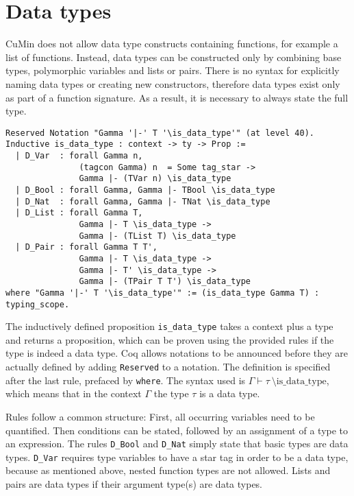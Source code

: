 \documentclass[fleqn]{scrreprt}
\newcommand{\coqinline}[1]{\texttt{#1}}
\begin{document}
\section{Data types}
CuMin does not allow data type constructs containing functions, for example a list of functions. Instead, data types can be constructed only by combining base types, polymorphic variables and lists or pairs. There is no syntax for explicitly naming data types or creating new constructors, therefore data types exist only as part of a function signature. As a result, it is necessary to always state the full type.
\begin{verbatim}
Reserved Notation "Gamma '|-' T '\is_data_type'" (at level 40).
Inductive is_data_type : context -> ty -> Prop :=
  | D_Var  : forall Gamma n,
               (tagcon Gamma) n  = Some tag_star ->
               Gamma |- (TVar n) \is_data_type
  | D_Bool : forall Gamma, Gamma |- TBool \is_data_type
  | D_Nat  : forall Gamma, Gamma |- TNat \is_data_type
  | D_List : forall Gamma T,
               Gamma |- T \is_data_type ->
               Gamma |- (TList T) \is_data_type
  | D_Pair : forall Gamma T T', 
               Gamma |- T \is_data_type ->
               Gamma |- T' \is_data_type ->
               Gamma |- (TPair T T') \is_data_type
where "Gamma '|-' T '\is_data_type'" := (is_data_type Gamma T) : typing_scope.
\end{verbatim}
The inductively defined proposition \coqinline{is_data_type} takes a context plus a type and returns a proposition, which can be proven using the provided rules if the type is indeed a data type. Coq allows notations to be announced before they are actually defined by adding \coqinline{Reserved} to a notation. The definition is specified after the last rule, prefaced by \coqinline{where}. The syntax used is $\Gamma \vdash \tau \: \text{\textbackslash is\_data\_type}$, which means that in the context $\Gamma$ the type $\tau$ is a data type.
\par
Rules follow a common structure: First, all occurring variables need to be quantified. Then conditions can be stated, followed by an assignment of a type to an expression.
The rules \coqinline{D_Bool} and \coqinline{D_Nat} simply state that basic types are data types. \coqinline{D_Var} requires type variables to have a star tag in order to be a data type, because as mentioned above, nested function types are not allowed. Lists and pairs are data types if their argument type(s) are data types.
\par
\end{document}
